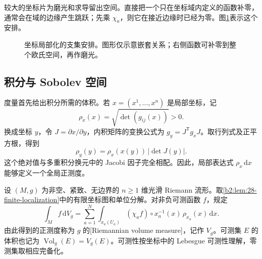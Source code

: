 较大的坐标片为磨光和求导留出空间。直接把一个只在坐标域内定义的函数补零，通常会在域的边缘产生跳跃；先乘 \(\chi_a\)，则它在接近边缘时已经为零。图\ref{b2:fig:28-chart-localization}表示这个安排。

\begin{figure}[htbp]
\centering
{}
\caption{坐标局部化的支集安排。图形仅示意嵌套关系；右侧函数可补零到整个欧氏空间，再作磨光。}
\label{b2:fig:28-chart-localization}
\end{figure}

\subsection{积分与 Sobolev 空间}
\label{b2:subsec:260102}

度量首先给出积分所需的体积。若 \(x=(x^1,\ldots,x^n)\) 是局部坐标，记
\[
 \rho_x(x)=\sqrt{\det(g_{ij}(x))}>0.
\]
换成坐标 \(y\)，令 \(J=\partial x/\partial y\)，内积矩阵的变换公式为 \(g_y=J^{\mathsf T}g_xJ\)。取行列式及正平方根，得到
\begin{equation}\label{b2:eq:28-volume-change}
 \rho_y(y)=\rho_x(x(y))\,|\det J(y)|.
\end{equation}
这个绝对值与多重积分换元中的 Jacobi 因子完全相配。因此，局部表达式 \(\rho_x\,\mathrm dx\) 能够定义一个全局正测度。

\begin{definition}\label{b2:def:28-volume}
设 \((M,g)\) 为非空、紧致、无边界的 \(n\geq1\) 维光滑 Riemann 流形。取\cref{b2:lem:28-finite-localization}中的有限坐标图和单位分解。对非负可测函数 \(f\)，规定
\begin{equation}\label{b2:eq:28-volume-integral}
 \int_M f\,\mathrm dV_g
 =\sum_{a=1}^N\int_{x_a(U_a)}
 (\chi_a f)\circ x_a^{-1}(x)\,\rho_{x_a}(x)\,\mathrm dx.
\end{equation}
由此得到的正测度称为 \(g\) 的[Riemannian volume measure]，记作 \(V_g\)。可测集 \(E\) 的体积也记为 \(\operatorname{Vol}_g(E)=V_g(E)\)。可测性按坐标中的 Lebesgue 可测性理解，零测集取相应完备化。
\end{definition}

